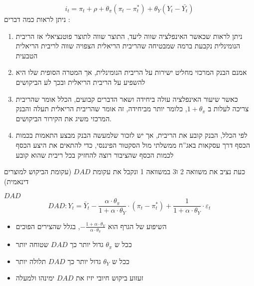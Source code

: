 \documentclass[usenames,dvipsnames]{beamer}
\begin{document}
\begin{RTL}
\begin{frame}[allowframebreaks]
    \framebreak
    $$i_t = \pi_t + \rho +\theta_\pi \left(\pi_t - \pi^*_t\right) + \theta_Y \left(Y_t - \bar{Y_t}\right)$$
    ניתן לראות כמה דברים :
    \begin{enumerate}
        \item ניתן לראות שכאשר האינפלציה שווה ליעד, התוצר שווה לתוצר פוטנציאלי אז הריבית הנומינלית נקבעת ברמה שמבטיחה שהריבית הריאלית הצפויה שווה לריבית הריאלית הטבעית
        \item אמנם הבנק המרכזי מחליט ישירות על הריבית הנומינלית, אך המטרה הסופית שלו היא להשפיע על הריבית הריאלית ובכך לע הביקושים
        \item כאשר שיעור האינפלציה עולה ביחידה ושאר הדברים קבועים, הכלל אומר שהריבית צריכה לעלות ב $1 + \theta_\pi$, כלומר יותר מביחידה, זה אומר שהריבית הריאלית תעלה והבנק המרכזי משיג את הקירור הביקושים.
        \item לפי הכלל, הבנק קובע את הריבית, אך יש לזכור שלמעשה הבנק מבצע התאמות בכמות הכסף דרך עסקאות באג''ח ממשלתי מול הסקטור הפיננסי, כדי להתאים את היצע הכסף לכמות הכסף שהציבור רוצה להחזיק בכל ריבית שהוא קובע
    \end{enumerate}

    \framebreak
    כעת נציב את משוואה 2 ו3 במשוואה 1 ונקבל את עקומת $DAD$ (עקומת הביקוש למוצרים דינאמית)
    \begin{block}{$DAD$}
        $$
D A D: Y_t=\bar{Y}_t-\frac{\alpha \cdot \theta_\pi}{1+\alpha \cdot \theta_Y} \cdot\left(\pi_t-\pi_t^*\right)+\frac{1}{1+\alpha \cdot \theta_Y} \cdot \varepsilon_t
$$
        \begin{itemize}
            \item השיפוע של הגרף הוא $-\frac{1 + \alpha \cdot \theta_Y}{\alpha \cdot \theta_\pi}$, בגלל שהצירים הפוכים
            \item ככל ש $\theta_\pi$ גדול יותר כך $DAD$ שטוחה יותר
            \item ככל ש $\theta_Y$ גדול יותר כך $DAD$ תלולה יותר
            \item זעזוע ביקוש חיובי יזיז את $DAD$ ימינהו ולמעלה
        \end{itemize}
        
    \end{block}
    

\end{frame}


\end{RTL}
\end{document}
